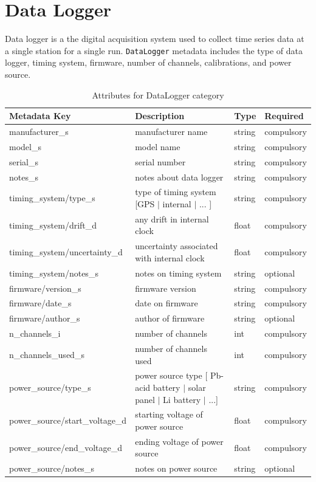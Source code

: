 \documentclass{article}
\begin{document}
\newpage
\section{Data Logger}

Data logger is a the digital acquisition system used to collect time series data at a single station for a single run.  \verb|DataLogger| metadata includes the type of data logger, timing system, firmware, number of channels, calibrations, and power source.

\begin{table}[htb!]
	\caption[Attributes for DataLogger]{Attributes for DataLogger category}
	\begin{tabular}{|l|p{3in}|l|l|}
		\hline
		\textbf{Metadata Key} & \textbf{Description} & \textbf{Type} & \textbf{Required} \\ \hline
		manufacturer\_s & manufacturer name & string & compulsory \\ \hline
		model\_s & model name & string & compulsory \\ \hline
		serial\_s & serial number & string & compulsory \\ \hline
		notes\_s & notes about data logger & string & compulsory \\ \hline
		timing\_system/type\_s & type of timing system [GPS $|$ internal $|$ ... ] & string & compulsory \\ \hline
		timing\_system/drift\_d & any drift in internal clock & float & compulsory \\ \hline
		timing\_system/uncertainty\_d & uncertainty associated with internal clock & float & compulsory \\ \hline
		timing\_system/notes\_s & notes on timing system & string & optional \\ \hline
		firmware/version\_s & firmware version & string & compulsory \\ \hline
		firmware/date\_s & date on firmware & string & compulsory \\ \hline
		firmware/author\_s & author of firmware & string & optional \\ \hline
		n\_channels\_i & number of channels & int & compulsory \\ \hline
		n\_channels\_used\_s & number of channels used & int & compulsory \\ \hline
		power\_source/type\_s & power source type [ Pb-acid battery $|$ solar panel $|$ Li battery $|$ ...] & string & compulsory \\ \hline
		power\_source/start\_voltage\_d & starting voltage of power source & float & compulsory \\ \hline
		power\_source/end\_voltage\_d & ending voltage of power source & float & compulsory \\ \hline
		power\_source/notes\_s & notes on power source & string & optional \\ \hline
	\end{tabular}
	\label{tab:datalogger}
\end{table}	
\end{document}
